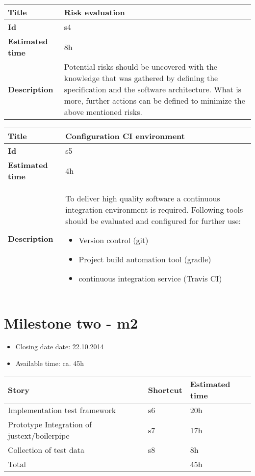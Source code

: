     \begin{tabular}{ | p{4cm} | p{10cm} |}
    \hline
    \textbf{Title} & Risk evaluation\\ \hline
    \textbf{Id} & s4\\ \hline
    \textbf{Estimated time} & 8h \\ \hline
    \textbf{Description} & Potential risks should be uncovered with the knowledge that was gathered by defining the specification and the software architecture. What is more, further actions can be defined to minimize the above mentioned risks.\\
    \hline
    \end{tabular}
    

    \begin{tabular}{ | p{4cm} | p{10cm} |}
    \hline
    \textbf{Title} & Configuration CI environment\\ \hline
    \textbf{Id} & s5\\ \hline
    \textbf{Estimated time} & 4h \\ \hline
    \textbf{Description} & To deliver high quality software a continuous integration environment is required. Following tools should be evaluated and configured for further use:
    \begin{itemize}
        \item Version control (git)
        \item Project build automation tool (gradle)
        \item continuous integration service (Travis CI)
    \end{itemize}
    \\
    \hline
    \end{tabular}


\section{Milestone two - m2}

\begin{itemize}
\item Closing date date: 22.10.2014
\item Available time: ca. 45h
\end{itemize}

    \begin{tabular}{ | p{10cm} | p{2cm} | p{2cm} |}
    \hline
    \textbf{Story} & \textbf{Shortcut}& \textbf{Estimated time} \\ \hline
    Implementation test framework & s6 & 20h \\
    Prototype Integration of justext/boilerpipe & s7 & 17h \\
    Collection of test data & s8 & 8h \\ \hline
    Total &  & 45h\\
    \hline
    \end{tabular}



